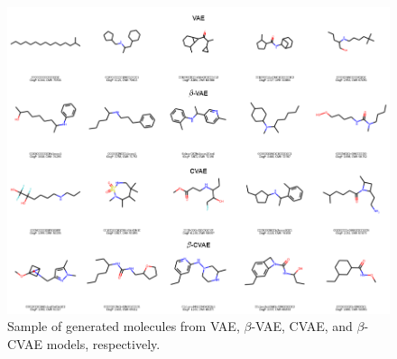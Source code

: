 \begin{figure}
    \centering
    \includegraphics[width=1\textwidth]{fig5.png}
    \caption{Sample of generated molecules from VAE, $\beta$-VAE, CVAE, and $\beta$-CVAE models, respectively.}
    \label{fig:img1}
\end{figure}

